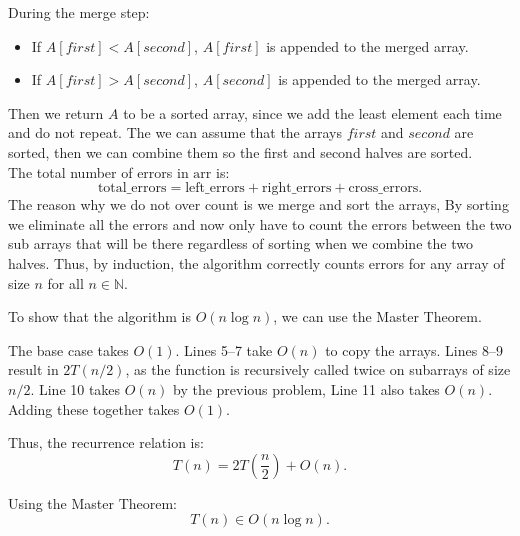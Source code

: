 \documentclass[12pt, letterpaper]{article}
\theoremstyle{definition}
\newcommand{\N}{\mathbb{N}}
\begin{document}
\begin{enumerate}[(a)]
\begin{itemize}
                During the merge step:
                \begin{itemize}
                    \item If $A[first] < A[second]$, $A[first]$ is appended to the merged array.
                    \item If $A[first] > A[second]$, $A[second]$ is appended to the merged array.
                \end{itemize}
                Then we return $A$ to be a sorted array, since we add the least element each time and do not repeat. The we can assume that the arrays $first$ and $second$ are sorted, then we can combine them so the first and second halves are sorted.\\
                The total number of errors in $\text{arr}$ is:
                \[
                \text{total\_errors} = \text{left\_errors} + \text{right\_errors} + \text{cross\_errors}.
                \]
                The reason why we do not over count is we merge and sort the arrays, By sorting we eliminate all the errors and now only have to count the errors between the two sub arrays that will be there regardless of sorting when we combine the two halves.
                Thus, by induction, the algorithm correctly counts errors for any array of size $n$ for all $n \in \N$.
            \end{itemize}
            To show that the algorithm is \( O(n \log n) \), we can use the Master Theorem. 

The base case takes \( O(1) \). Lines 5–7 take \( O(n) \) to copy the arrays. Lines 8–9 result in \( 2T(n/2) \), as the function is recursively called twice on subarrays of size \( n/2 \). Line 10 takes \( O(n) \) by the previous problem, Line 11 also takes \( O(n) \). Adding these together takes \( O(1) \).

Thus, the recurrence relation is:
\[
T(n) = 2T\left(\frac{n}{2}\right) + O(n).
\]

Using the Master Theorem:
\[
T(n) \in O(n \log n).
\]

\end{enumerate}

\newpage
\end{document}

